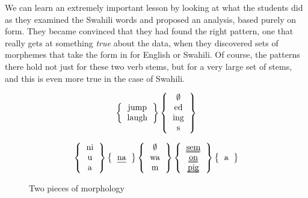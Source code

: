 \documentclass[output=paper,colorlinks,citecolor=brown]{langscibook}
\begin{document}
We can learn an extremely important lesson by looking at what the students did as they examined the Swahili words and proposed an analysis, based purely on form. They became convinced that they had found the right pattern, one that really gets at something \textit{true} about the data,  when they discovered sets of morphemes that take the form in  for English or Swahili. Of course, the patterns there hold not just for these two verb stems, but for a very large set of stems, and this is even more true in the case of Swahili.

\begin{figure}
  \[ \left\{ \begin{tabular}{c} jump \\ laugh  \end{tabular} \right\}  \left\{ \begin{tabular}{c} $\emptyset$ \\ed\\ing\\s \end{tabular}  \right\} \]

 \[ \left\{ 
\begin{tabular}{c} 
ni \\ u \\ a 
\end{tabular} 
\right\}
\left\{ 
\begin{tabular}{c}
\uline{na} 
\end{tabular}  
\right\}  
\left\{ 
\begin{tabular}{c} 
$\emptyset$ \\ wa  \\ m 
\end{tabular} 
\right\} 
\left\{ 
\begin{tabular}{c} 
\uuline{sem} \\ \uuline{on} \\ \uuline{pig}  
\end{tabular}  
\right\}
\left\{ 
\begin{tabular}{c}
a 
\end{tabular}  
\right\} 
\]
\caption{Two pieces of morphology}
\label{morphology}
\end{figure}
 


 
\end{document}
